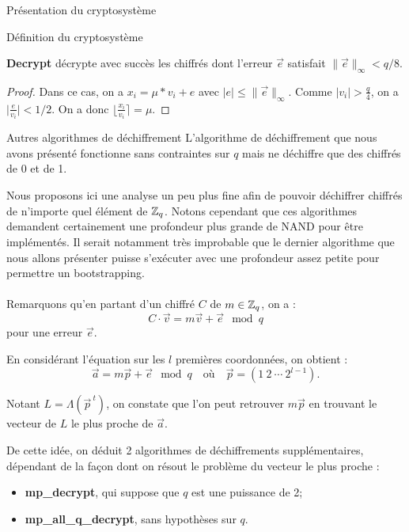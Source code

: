 \begin{section}{Présentation du cryptosystème}
\begin{subsection}{Définition du cryptosystème}
\begin{prop}
\label{dec}
\textbf{Decrypt} décrypte avec succès les chiffrés dont l'erreur $\vec{e}$ satisfait $\|\vec{e}\|_\infty < q/8$.
\end{prop}
\begin{proof}
	Dans ce cas, on a $x_i = \mu * v_i + e$ avec $\lvert e \lvert \leqslant \|\vec{e}\|_\infty$. Comme $\lvert v_i \lvert > \frac{q}{4}$, on a $\lvert \frac{e}{v_i} \lvert < 1/2$. On a donc $\lfloor \frac{x_i}{v_i} \rceil = \mu$.
\end{proof}
	\end{subsection}
	
\begin{subsection}{Autres algorithmes de déchiffrement}
	L'algorithme de déchiffrement que nous avons présenté fonctionne sans contraintes sur $q$ mais ne déchiffre que des chiffrés de 0 et de 1.

	Nous proposons ici une analyse un peu plus fine afin de pouvoir déchiffrer chiffrés de n'importe quel élément de
	$\mathbb{Z}_q$.  Notons cependant que ces algorithmes demandent certainement une profondeur plus grande de NAND pour
	être implémentés. Il serait notamment très improbable que le dernier algorithme que nous allons présenter puisse
	s'exécuter avec une profondeur assez petite pour permettre un bootstrapping.

\paragraph{}
	Remarquons qu'en partant d'un chiffré  $C$ de $m \in \mathbb{Z}_q$, on a : \[ C \cdot \vec{v} = m \vec{v} + \vec{e} \mod
	q \] pour une erreur $\vec{e}$.
	
	En considérant l'équation sur les $l$ premières coordonnées, on obtient :
	\[\vec{a} = m \vec{p} + \vec{e} \mod q\quad \text{où}\quad \vec{p} = (1\:2\:\cdots\:2^{l-1}). \]
 
	Notant $L = \Lambda(\vec{p}^{\:t})$, on constate que l'on peut retrouver $m\vec{p}$ en trouvant le vecteur de $L$ le plus proche de $\vec{a}$.

	De cette idée, on déduit 2 algorithmes de déchiffrements supplémentaires, dépendant de la façon dont on résout le problème du vecteur le plus proche :

\begin{itemize}
\item \textbf{mp\_decrypt}, qui suppose que $q$ est une puissance de 2;
\item \textbf{mp\_all\_q\_decrypt}, sans hypothèses sur $q$.
\end{itemize}


\end{subsection}
\end{section}
